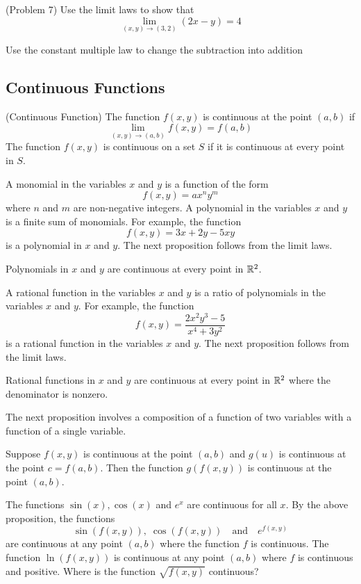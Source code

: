\documentclass[handout]{ximera}
\begin{document}
\begin{problem}(Problem 7)
Use the limit laws to show that 
\[
\lim_{(x,y) \to (3,2)} (2x - y) = 4
\]
\begin{hint}
Use the constant multiple law to change the subtraction into addition
\end{hint}
\end{problem}

\subsection{Continuous Functions}
\begin{definition}(Continuous Function)
The function $f(x,y)$ is continuous at the point $(a,b)$ if
\[
\lim_{(x,y) \to (a,b)} f(x,y) = f(a,b)
\]
The function $f(x,y)$ is continuous on a set $S$ if it is continuous at 
every point in $S$.
\end{definition}
A monomial in the variables $x$ and $y$ is a function of the form
\[
f(x,y)= ax^ny^m
\]
where $n$ and $m$ are non-negative integers.  
A polynomial in the variables $x$ and $y$ is a finite sum of monomials.
For example, the function
\[
f(x,y) = 3x + 2y - 5xy
\]
is a polynomial in $x$ and $y$. The next proposition follows from the limit laws.

\begin{proposition}
Polynomials in $x$ and $y$ are continuous at every point in $\mathbb R^2$.
\end{proposition}

A rational function in the variables $x$ and $y$ is a ratio of polynomials in the 
variables $x$ and $y$.
For example, the function
\[
f(x,y) = \frac{2x^2y^3 - 5}{x^4 + 3y^2}
\]
is a rational function in the variables $x$ and $y$.
The next proposition follows from the limit laws.

\begin{proposition}
Rational functions in $x$ and $y$ are continuous at every 
point in $\mathbb R^2$ where the denominator is nonzero.
\end{proposition}

The next proposition involves a composition of a function of two variables 
with a function of a single variable.

\begin{proposition}
Suppose $f(x,y)$ is continuous at the point $(a,b)$ 
and $g(u)$ is continuous at the point $ c = f(a,b)$.
Then the function $g(f(x,y))$ is continuous at the point $(a,b)$.
\end{proposition}

The functions $\sin(x), \cos(x)$ and $e^x$ are continuous for all $x$.  
By the above proposition, the functions
\[
\sin(f(x,y)),\; \cos(f(x,y)) \quad \text{and} \quad e^{f(x,y)}
\]
are continuous at any point $(a,b)$ where the function $f$ is continuous. 
The function $\ln(f(x,y))$ is continuous at any point $(a,b)$ where $f$ is continuous 
and positive. Where is the function $\sqrt{f(x,y)}$ continuous?
\end{document}
